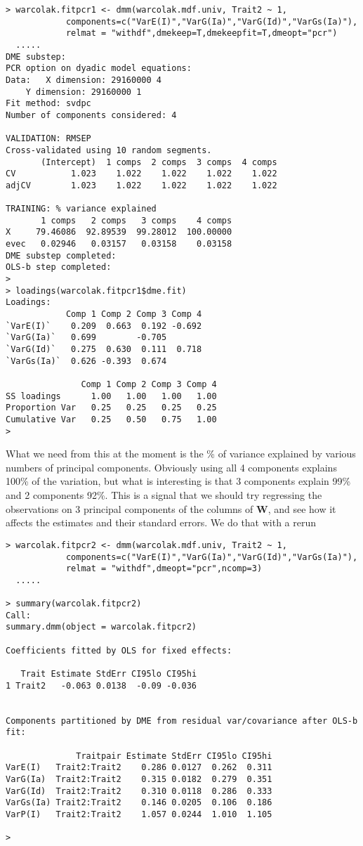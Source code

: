\documentclass[titlepage,a4paper,12pt]{article}  %
\begin{document}
\begin{verbatim}
> warcolak.fitpcr1 <- dmm(warcolak.mdf.univ, Trait2 ~ 1,
            components=c("VarE(I)","VarG(Ia)","VarG(Id)","VarGs(Ia)"),
            relmat = "withdf",dmekeep=T,dmekeepfit=T,dmeopt="pcr")
  .....
DME substep:
PCR option on dyadic model equations:
Data: 	X dimension: 29160000 4 
	Y dimension: 29160000 1
Fit method: svdpc
Number of components considered: 4

VALIDATION: RMSEP
Cross-validated using 10 random segments.
       (Intercept)  1 comps  2 comps  3 comps  4 comps
CV           1.023    1.022    1.022    1.022    1.022
adjCV        1.023    1.022    1.022    1.022    1.022

TRAINING: % variance explained
       1 comps   2 comps   3 comps    4 comps
X     79.46086  92.89539  99.28012  100.00000
evec   0.02946   0.03157   0.03158    0.03158
DME substep completed:
OLS-b step completed:
> 
> loadings(warcolak.fitpcr1$dme.fit)
Loadings:
            Comp 1 Comp 2 Comp 3 Comp 4
`VarE(I)`    0.209  0.663  0.192 -0.692
`VarG(Ia)`   0.699        -0.705       
`VarG(Id)`   0.275  0.630  0.111  0.718
`VarGs(Ia)`  0.626 -0.393  0.674       

               Comp 1 Comp 2 Comp 3 Comp 4
SS loadings      1.00   1.00   1.00   1.00
Proportion Var   0.25   0.25   0.25   0.25
Cumulative Var   0.25   0.50   0.75   1.00
>
\end{verbatim}

What we need from this at the moment is the \% of variance explained by various numbers of principal components. Obviously using all 4 components explains 100\% of the variation, but what is interesting is that  3 components explain 99\% and 2 components 92\%. This is a signal that we should try regressing the observations on 3 principal components of the columns of $\bm{W}$, and see how it affects the estimates and their standard errors. We do that with a rerun

\begin{verbatim}
> warcolak.fitpcr2 <- dmm(warcolak.mdf.univ, Trait2 ~ 1,
            components=c("VarE(I)","VarG(Ia)","VarG(Id)","VarGs(Ia)"),
            relmat = "withdf",dmeopt="pcr",ncomp=3)
  .....

> summary(warcolak.fitpcr2)
Call:
summary.dmm(object = warcolak.fitpcr2)

Coefficients fitted by OLS for fixed effects:

   Trait Estimate StdErr CI95lo CI95hi
1 Trait2   -0.063 0.0138  -0.09 -0.036


Components partitioned by DME from residual var/covariance after OLS-b fit:

              Traitpair Estimate StdErr CI95lo CI95hi
VarE(I)   Trait2:Trait2    0.286 0.0127  0.262  0.311
VarG(Ia)  Trait2:Trait2    0.315 0.0182  0.279  0.351
VarG(Id)  Trait2:Trait2    0.310 0.0118  0.286  0.333
VarGs(Ia) Trait2:Trait2    0.146 0.0205  0.106  0.186
VarP(I)   Trait2:Trait2    1.057 0.0244  1.010  1.105

> 
\end{verbatim}
\end{document}
